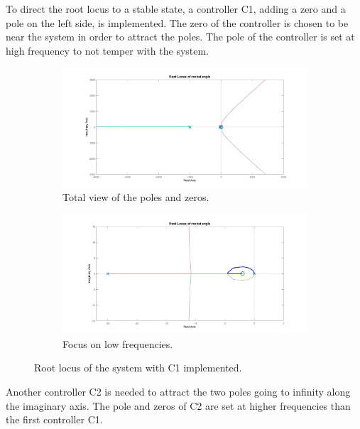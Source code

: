 To direct the root locus to a stable state, a controller C1, adding a zero and a pole on the left side, is implemented. The zero of the controller is chosen to be near the system in order to attract the poles. The pole of the controller is set at high frequency to not temper with the system. 

\begin{figure}[htbp]
	\centering
	\begin{subfigure}{0.45\textwidth}
		\includegraphics[width=\textwidth]{figures/Rocket/design/tf_with_controller_1C_1_vf}
		\caption{Total view of the poles and zeros.}
		\label{fig:SystemC1}
	\end{subfigure}
	\begin{subfigure}{0.45\textwidth}
		\centering
		\includegraphics[width=\textwidth]{figures/Rocket/design/tf_with_C1_zoom_vf}
		\caption{Focus on low frequencies.}
		\label{fig:SystemC1zoom}
	\end{subfigure}
	\caption{Root locus of the system with C1 implemented.}
\end{figure}

Another controller C2 is needed to attract the two poles going to infinity along the imaginary axis. The pole and zeros of C2 are set at higher frequencies than the first controller C1. 

